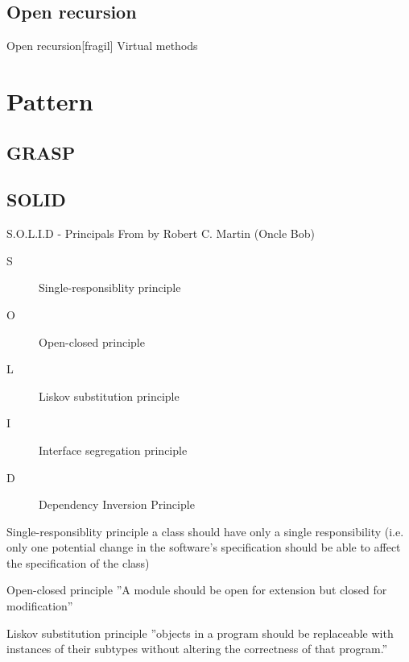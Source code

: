 \documentclass{beamer}
\begin{document}
\subsection{Open recursion}
\begin{frame}{Open recursion}[fragil]
Virtual methods




\end{frame}


\section{Pattern}


\subsection{GRASP}

\subsection{SOLID}

\begin{frame}{S.O.L.I.D - Principals}
From by Robert C. Martin (Oncle Bob)


\begin{description}
\item [S] Single-responsiblity principle
\item [O] Open-closed principle
\item [L] Liskov substitution principle
\item [I] Interface segregation principle
\item [D] Dependency Inversion Principle
\end{description}
\end{frame}

\begin{frame}{Single-responsiblity principle}
a class should have only a single responsibility (i.e. only one potential change
in the software's specification should be able to affect the specification of the class)
\end{frame}

\begin{frame}{Open-closed principle}
''A module should be open for extension but closed for modification''
\end{frame}

\begin{frame}{Liskov substitution principle}
''objects in a program should be replaceable with instances of their subtypes
without altering the correctness of that program.''
\end{frame}
\end{document}
